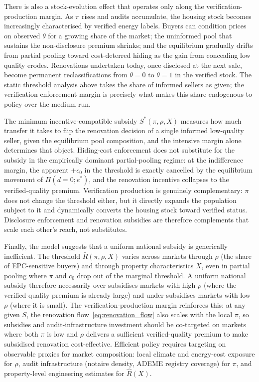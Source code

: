 \documentclass[10pt,letterpaper]{bp-template-concise}
\begin{document}
There is also a stock-evolution effect that operates only along the verification-production margin. As $\pi$ rises and audits accumulate, the housing stock becomes increasingly characterised by verified energy labels. Buyers can condition prices on observed $\theta$ for a growing share of the market; the uninformed pool that sustains the non-disclosure premium shrinks; and the equilibrium gradually drifts from partial pooling toward cost-deterred hiding as the gain from concealing low quality erodes. Renovations undertaken today, once disclosed at the next sale, become permanent reclassifications from $\theta=0$ to $\theta=1$ in the verified stock. The static threshold analysis above takes the share of informed sellers as given; the verification enforcement margin is precisely what makes this share endogenous to policy over the medium run.

\medskip

The minimum incentive-compatible subsidy $S^*(\pi,\rho,X)$ measures how much transfer it takes to flip the renovation decision of a single informed low-quality seller, given the equilibrium pool composition, and the intensive margin alone determines that object. Hiding-cost enforcement does not substitute for the subsidy in the empirically dominant partial-pooling regime: at the indifference margin, the apparent $+c_0$ in the threshold is exactly cancelled by the equilibrium movement of $\Pi(d=0;e^*)$, and the renovation incentive collapses to the verified-quality premium. Verification production is genuinely complementary: $\pi$ does not change the threshold either, but it directly expands the population subject to it and dynamically converts the housing stock toward verified status. Disclosure enforcement and renovation subsidies are therefore complements that scale each other's reach, not substitutes.

\medskip Finally, the model suggests that a uniform national subsidy is generically inefficient. The threshold $\bar{R}(\pi,\rho,X)$ varies across markets through $\rho$ (the share of EPC-sensitive buyers) and through property characteristics $X$, even in partial pooling where $\pi$ and $c_0$ drop out of the marginal threshold. A uniform national subsidy therefore necessarily over-subsidises markets with high $\rho$ (where the verified-quality premium is already large) and under-subsidises markets with low $\rho$ (where it is small). The verification-production margin reinforces this: at any given $S$, the renovation flow~\eqref{eq:renovation_flow} also scales with the local $\pi$, so subsidies and audit-infrastructure investment should be co-targeted on markets where both $\pi$ is low and $\rho$ delivers a sufficient verified-quality premium to make subsidised renovation cost-effective. Efficient policy requires targeting on observable proxies for market composition: local climate and energy-cost exposure for $\rho$, audit infrastructure (notaire density, ADEME registry coverage) for $\pi$, and property-level engineering estimates for $\hat{R}(X)$.
\end{document}
